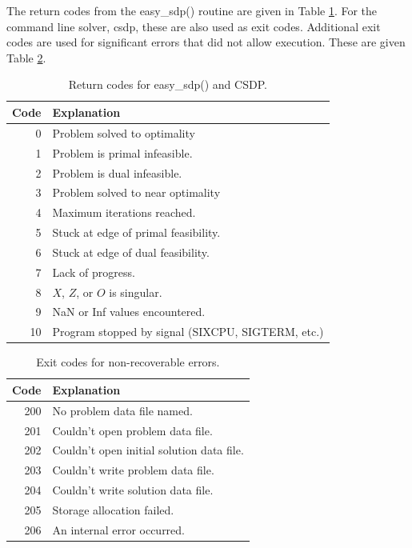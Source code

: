 \documentclass{article}
\begin{document}
The return codes from the easy\_sdp() routine are given in Table
\ref{retcodetable}.  For the command line solver, csdp, these are also
used as exit codes.  Additional exit codes are used for significant
errors that did not allow execution.  These are given Table
\ref{exitcodetable}.

\begin{table}
\begin{tabular}{|r|l|} \hline
  Code & Explanation \\  \hline
  0    & Problem solved to optimality \\ \hline
  1    & Problem is primal infeasible. \\  \hline
  2    & Problem is dual infeasible. \\  \hline
  3    & Problem solved to near optimality \\  \hline
  4    & Maximum iterations reached. \\  \hline
  5    & Stuck at edge of primal feasibility. \\ \hline
  6    & Stuck at edge of dual feasibility.  \\  \hline
  7    & Lack of progress. \\ \hline
  8    & $X$, $Z$, or $O$ is singular. \\ \hline
  9    & NaN or Inf values encountered. \\ \hline
  10   & Program stopped by signal (SIXCPU, SIGTERM, etc.) \\ \hline
\end{tabular}
\caption{Return codes for easy\_sdp() and CSDP.}
\label{retcodetable}
\end{table}

\begin{table}
\begin{tabular}{|r|l|} \hline
  Code   & Explanation \\  \hline
  200    & No problem data file named. \\   \hline
  201    & Couldn't open problem data file. \\  \hline
  202    & Couldn't open initial solution data file. \\   \hline
  203    & Couldn't write problem data file. \\   \hline
  204    & Couldn't write solution data file. \\  \hline
  205    & Storage allocation failed. \\  \hline
  206    & An internal error occurred. \\  \hline
\end{tabular}
\caption{Exit codes for non-recoverable errors.}
\label{exitcodetable}
\end{table}
\end{document}
